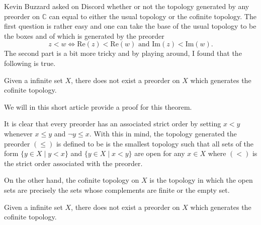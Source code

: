 \documentclass{article}
\begin{document}
Kevin Buzzard asked on Discord whether or not
the topology generated by any preorder on \(\mathbb{C}\) can equal to either the usual topology or the cofinite topology.
The first question is rather easy and one can take the base of the usual topology to be the boxes and of which
is generated by the preorder
\[z < w \iff \text{Re}(z) < \text{Re}(w) \text{ and } \text{Im}(z) < \text{Im}(w).\]
The second part is a bit more tricky and by playing around, I found that the following is true.

\begin{theorem}
Given a infinite set \(X\), there does not exist a preorder on \(X\) which generates the cofinite topology.
\end{theorem}

We will in this short article provide a proof for this theorem.

It is clear that every preorder has an associated strict order by setting \(x < y\) whenever \(x \le y\) and \(\neg y \le x\).
With this in mind, the topology generated the preorder \((\le)\) is defined to be is the smallest topology such that all sets of the
form \(\{y \in X \mid y < x\}\) and \(\{y \in X \mid x < y\}\) are open for any \(x \in X\) where \((<)\) is the strict
order associated with the preorder.

On the other hand, the cofinite topology on \(X\) is the topology in which the open sets are precisely
the sets whose complements are finite or the empty set.

\begin{proposition}
Given a infinite set \(X\), there does not exist a preorder on \(X\) which generates the cofinite topology.
\end{proposition}
\end{document}
